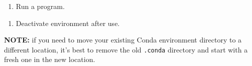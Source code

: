 \documentclass[]{book}
\newenvironment{Shaded}{\begin{snugshade}}{\end{snugshade}}
\newcommand{\StringTok}[1]{\textcolor[rgb]{0.31,0.60,0.02}{#1}}
\newcommand{\OperatorTok}[1]{\textcolor[rgb]{0.81,0.36,0.00}{\textbf{#1}}}
\newcommand{\NormalTok}[1]{#1}
\providecommand{\tightlist}{%
  \setlength{\itemsep}{0pt}\setlength{\parskip}{0pt}}
\begin{document}
\begin{Shaded}
\end{Shaded}

\begin{enumerate}
\def\labelenumi{\arabic{enumi}.}
\setcounter{enumi}{11}
\tightlist
\item
  Run a program.
\end{enumerate}

\begin{Shaded}
\end{Shaded}

\begin{enumerate}
\def\labelenumi{\arabic{enumi}.}
\setcounter{enumi}{12}
\tightlist
\item
  Deactivate environment after use.
\end{enumerate}

\begin{Shaded}
\end{Shaded}

\textbf{NOTE:} if you need to move your existing Conda environment
directory to a different location, it's best to remove the old
\texttt{.conda} directory and start with a fresh one in the new
location.
\end{document}
